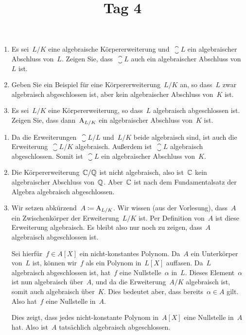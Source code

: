 \documentclass{scrartcl}
\title{\vspace{-1em}Tag 4}
\author{}
\date{}
\begin{document}
\maketitle
\vspace{-7em}

\begin{exercise}
  \begin{enumerate}
    \item
      Es sei~$L/K$ eine algebraische Körpererweiterung und~$\closure{L}$ ein algebraischer Abschluss von~$L$.
      Zeigen Sie, dass~$\closure{L}$ auch ein algebraischer Abschluss von~$L$ ist.
    \item
      Geben Sie ein Beispiel für eine Körpererweiterung~$L/K$ an, so dass~$L$ zwar algebraisch abgeschlossen ist, aber kein algebraischer Abschluss von~$K$ ist.
    \item
      Es sei~$L/K$ eine Körpererweiterung, so dass~$L$ algebraisch abgeschlossen ist.
      Zeigen Sie, dass dann~$\operatorname{A}_{L/K}$ ein algebraischer Abschluss von~$K$ ist.
  \end{enumerate}
\end{exercise}

\begin{solution}
  \begin{enumerate}
    \item
      Da die Erweiterungen~$\closure{L} / L$ und~$L / K$ beide algebraisch sind, ist auch die Erweiterung~$\closure{L} / K$ algebraisch.
      Außerdem ist~$\closure{L}$ algebraisch abgeschlossen.
      Somit ist~$\closure{L}$ ein algebraischer Abschluss von~$K$.
    \item
      Die Körpererweiterung~$\mathbb{C} / \mathbb{Q}$ ist nicht algebraisch, also ist~$\mathbb{C}$ kein algebraischer Abschluss von~$\mathbb{Q}$.
      Aber~$\mathbb{C}$ ist nach dem Fundamentalsatz der Algebra algebraisch abgeschlossen.
    \item
      Wir setzen abkürzend~$A \coloneqq \operatorname{A}_{L/K}$.
      Wir wissen (aus der Vorlesung), dass~$A$ ein Zwischenkörper der Erweiterung~$L/K$ ist.
      Per Definition von~$A$ ist diese Erweiterung algebraisch.
      Es bleibt also nur noch zu zeigen, dass~$A$ algebraisch abgeschlossen ist.

      Sei hierfür~$f \in A[X]$ ein nicht-konstantes Polynom.
      Da~$A$ ein Unterkörper von~$L$ ist, können wir~$f$ als ein Polynom in~$L[X]$ auffasen.
      Da~$L$ algebraisch abgeschlossen ist, hat~$f$ eine Nullstelle~$\alpha$ in~$L$.
      Dieses Element~$\alpha$ ist nun algebraisch über~$A$, und da die Erweiterung~$A / K$ algebraisch ist, somit auch algebraisch über~$K$.
      Dies bedeutet aber, dass bereits~$\alpha \in A$ gilt.
      Also hat~$f$ eine Nullstelle in~$A$.

      Dies zeigt, dass jedes nicht-konstante Polynom in~$A[X]$ eine Nullstelle in~$A$ hat.
      Also ist~$A$ tatsächlich algebraisch abgeschlossen.
  \end{enumerate}
\end{solution}
\end{document}
